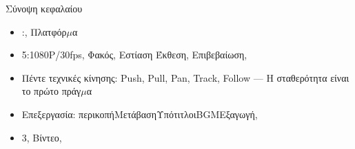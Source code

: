 \begin{tcbsummary}{Σύνοψη κεφαλαίου}
\begin{itemize}
  \item :, Πλατφόρ$\mu$α
  \item 5:1080P/30fps, Φακός, Εστίαση Έκθεση, Επιβεβαίωση,
  \item Πέντε τεχνικές κίνησης: Push, Pull, Pan, Track, Follow — Η σταθερότητα είναι το πρώτο πράγ$\mu$α
  \item Επεξεργασία: περικοπήΜετάβασηΥπότιτλοιBGMΕξαγωγή,
  \item 3, Βίντεο,
\end{itemize}

\end{tcbsummary}
